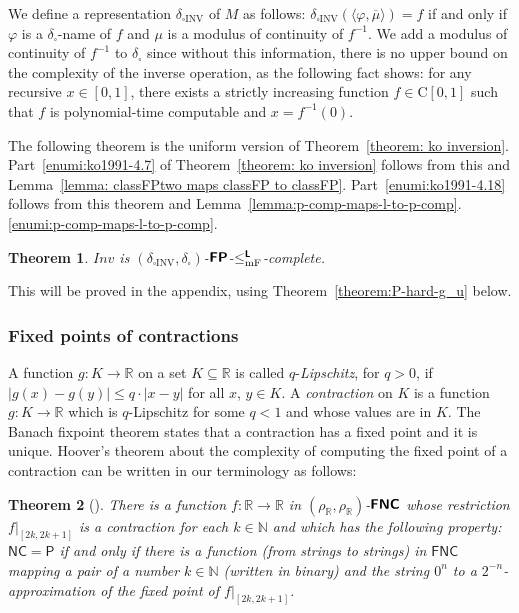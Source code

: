 \documentclass[conference]{IEEEtran}
\newcommand{\R}{\mathbb R}
\newcommand{\N}{\mathbb N}
\newcommand{\classonefont}[1]{\mathsf{#1}}
\newcommand{\classP}{\classonefont{P}}
\newcommand{\classNC}{\classonefont{NC}}
\newcommand{\classFNC}{\classonefont{FNC}}
\newcommand{\classtwofont}[1]{\text{\bfseries \sffamily \upshape #1}}
\newcommand{\classLtwo}{\classtwofont{L}}
\newcommand{\classFNCtwo}{\classtwofont{FNC}}
\newcommand{\classFPtwo}{\classtwofont{FP}}
\newcommand{\deltabox}{\delta _\square}
\newcommand{\deltaboxINV}{\delta _{\square \mathrm{INV}}}
\newcommand{\rhoR}{\rho _\R}
\newcommand{\redmF}{\leq _{\mathrm{mF}}}
\newcommand{\redLmF}{\redmF ^{\classLtwo}}
\newcommand{\classC}{\mathrm C}
\newcommand{\OpINV}{\mathit{Inv}}
\newtheorem{theorem}{Theorem}[section]
\theoremstyle{definition}
\theoremstyle{remark}
\begin{document}
We define a representation $\deltaboxINV$ of $M$ as follows:
$\deltaboxINV(\langle \varphi, \overline{\mu} \rangle) = f$ 
if and only if $\varphi$ is a $\deltabox$-name of $f$ 
and $\mu$ is a modulus of continuity of $f^{-1}$.
We add a modulus of continuity of $f^{-1}$ to $\deltabox$
since without this information, there is no upper bound on 
the complexity of the inverse operation, 
as the following fact \cite[Theorem 4.4]{ko1991complexity} shows: 
for any recursive $x \in [0, 1]$, 
there exists a strictly increasing function $f \in \classC[0, 1]$ 
such that $f$ is polynomial-time computable and $x = f^{-1}(0)$.

The following theorem is the uniform version of Theorem~\ref{theorem: ko inversion}. 
Part~\ref{enumi:ko1991-4.7} of Theorem~\ref{theorem: ko inversion} 
follows from this and Lemma~\ref{lemma: classFPtwo maps classFP to classFP}.
Part~\ref{enumi:ko1991-4.18} follows from this theorem and Lemma~\ref{lemma:p-comp-maps-l-to-p-comp}.\ref{enumi:p-comp-maps-l-to-p-comp}.

\begin{theorem}
 \label{theorem:INV-is-P-complete}
 $\OpINV$ is $(\deltaboxINV, \deltabox)$-$\classFPtwo$-$\redLmF$-complete.
\end{theorem}

This will be proved in the appendix, 
using 
Theorem~\ref{theorem:P-hard-g_u} below. 

\subsubsection{Fixed points of contractions}

A function $g \colon K \to \R$ on a set $K \subseteq \R$
is called $q$-\emph{Lipschitz}, for $q > 0$, 
if $
\lvert g (x) - g (y) \rvert \leq q \cdot \lvert x - y \rvert
$ for all $x$, $y \in K$. 
A \emph{contraction} on $K$ is 
a function $g \colon K \to \R$ which is $q$-Lipschitz for some $q < 1$
and whose values are in $K$. 
The Banach fixpoint theorem states that 
a contraction has a fixed point and it is unique. 
Hoover's theorem about the complexity of computing the fixed point
of a contraction can be written in our terminology as follows:

\begin{theorem}
[{\cite[Theorem 4.5]{hoover1991real}}]
\label{theorem:hoover1991-4.5}
 There is a function $f \colon \R \to \R$ in $(\rhoR, \rhoR)$-$\classFNCtwo$
 whose restriction $f|_{[2k, 2k+1]}$ is a contraction for each $k \in \N$ and
 which has the following property: 
 $\classNC = \classP$ if and only if 
 there is a function (from strings to strings) in $\classFNC$ mapping 
 a pair of a number $k \in \N$ (written in binary) and the string $0^n$
 to a $2^{-n}$-approximation of the 
 fixed point of $f |_{[2k, 2k + 1]}$. 
\end{theorem}
\end{document}
